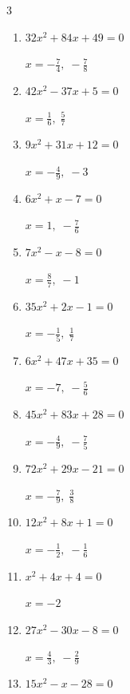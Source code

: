 \begin{multicols}{3}
\begin{enumerate}
        $\displaystyle x=\frac{1}{9},\; -\frac{9}{5}$

  \item $32x^{2}+84x+49=0$

        $\displaystyle x=-\frac{7}{4},\; -\frac{7}{8}$

  \item $42x^{2}-37x+5=0$

        $\displaystyle x=\frac{1}{6},\; \frac{5}{7}$

  \item $9x^{2}+31x+12=0$

        $\displaystyle x=-\frac{4}{9},\; -3$

  \item $6x^{2}+x-7=0$

        $\displaystyle x=1,\; -\frac{7}{6}$

  \item $7x^{2}-x-8=0$

        $\displaystyle x=\frac{8}{7},\; -1$

\columnbreak %

  \item $35x^{2}+2x-1=0$

        $\displaystyle x=-\frac{1}{5},\; \frac{1}{7}$

  \item $6x^{2}+47x+35=0$

        $\displaystyle x=-7,\; -\frac{5}{6}$

  \item $45x^{2}+83x+28=0$

        $\displaystyle x=-\frac{4}{9},\; -\frac{7}{5}$

  \item $72x^{2}+29x-21=0$

        $\displaystyle x=-\frac{7}{9},\; \frac{3}{8}$

  \item $12x^{2}+8x+1=0$

        $\displaystyle x=-\frac{1}{2},\; -\frac{1}{6}$

  \item $x^{2}+4x+4=0$

        $\displaystyle x=-2$

  \item $27x^{2}-30x-8=0$

        $\displaystyle x=\frac{4}{3},\; -\frac{2}{9}$

  \item $15x^{2}-x-28=0$


\end{enumerate}
\end{multicols}
